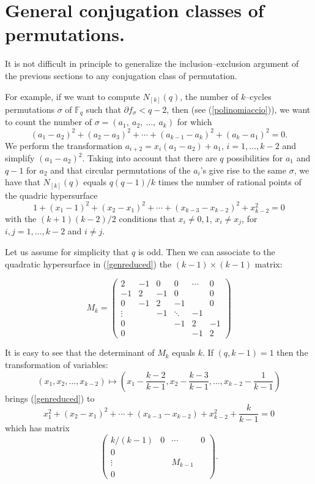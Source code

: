 \documentclass[10pt,a4paper,twoside]{article}
\def\Fq{{\mathbb{F}}_q}
\begin{document}
\section{General conjugation classes of permutations.}

It is not difficult in principle to generalize the 
inclusion--exclusion argument of the
previous sections to any conjugation class of permutation.

For example, if we want to compute $N_{[k]}(q)$, the number
of $k$--cycles permutations $\sigma$ of $\Fq$ such that
$\partial f_\sigma<q-2$, then (see
 (\ref{polinomiaccio})), we want to count the number of
$\sigma=(a_1,\ a_2,\ \ldots,\ a_k)$ for which
$$(a_1-a_2)^2+(a_2-a_3)^2+\cdots+(a_{k-1}-a_k)^2+(a_k-a_1)^2=0.$$
We perform the transformation $a_{i+2}=x_i(a_1-a_2)+a_1$, $i=1,\ldots,k-2$ and
simplify $(a_1-a_2)^2$. Taking into account that there are $q$ possibilities for $a_1$
and $q-1$ for $a_2$ and that circular permutations of the $a_i$'s give rise to the same
$\sigma$, we have that $N_{[k]}(q)$ equals $q(q-1)/k$ times the number
of rational points
of the quadric hypersurface
\begin{equation}\label{genreduced}
1+(x_1-1)^2+(x_2-x_1)^2+\cdots+(x_{k-3}-x_{k-2})^2+x_{k-2}^2=0
\end{equation}
with the $(k+1)(k-2)/2$ conditions that $x_i\neq 0,1$, $x_i\neq x_j$,
for $i,j=1,\ldots,k-2$
and $i\neq j$.

Let us assume for simplicity that $q$ is odd. Then
we can associate to the quadratic hypersurface in (\ref{genreduced}) the
$(k-1)\times(k-1)$ matrix:

\begin{equation}\label{matrix}M_k=
\left(\begin{array}{cccccc}
2 & -1 & 0 & 0 & \cdots & 0 \\
-1 & 2 & -1 & 0 & & 0\\
0 & -1 & 2 & -1 & &0\\
\vdots& & -1&  \ddots & -1\\
0 & & & -1& 2& -1\\
0 & & & & -1 & 2
\end{array}\right)
\end{equation}

It is easy to see that the determinant of $M_k$ equals $k$.
If $(q,k-1)=1$ then the transformation of variables:
$$(x_1,x_2,\ldots,x_{k-2})\mapsto \left(x_1-\frac{k-2}{k-1},x_2-
\frac{k-3}{k-1},\ldots,x_{k-2}
-\frac1{k-1}\right)$$
brings (\ref{genreduced}) to
$$x_1^2+(x_2-x_1)^2+\cdots+(x_{k-3}-x_{k-2})+x_{k-2}^2+\frac k{k-1}=0$$
which has matrix
$$
\left(\begin{array}{cccc}
k/(k-1) & 0 & \cdots & 0\\
0 & & & \\
\vdots  & & M_{k-1} & \\
0 & & &
\end{array}
\right).$$
\end{document}
